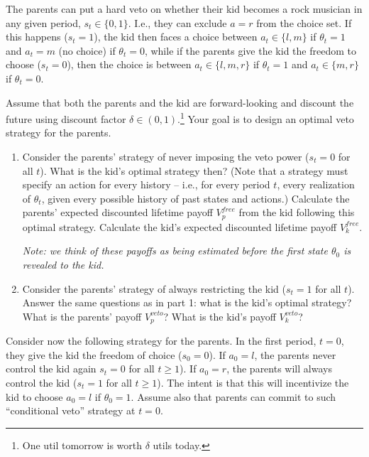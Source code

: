 \documentclass[a4paper]{article}
\begin{document}
	The parents can put a hard veto on whether their kid becomes a rock musician in any given period, $s_t \in \{0,1\}$. I.e., they can exclude $a=r$ from the choice set. If this happens ($s_t=1$), the kid then faces a choice between $a_t \in \{l,m\}$ if $\theta_t=1$ and $a_t = m$ (no choice) if $\theta_t=0$, while if the parents give the kid the freedom to choose ($s_t=0$), then the choice is between $a_t \in \{l,m,r\}$ if $\theta_t=1$ and $a_t \in \{m,r\}$ if $\theta_t=0$.
	
	Assume that both the parents and the kid are forward-looking and discount the future using discount factor $\delta \in (0,1)$.\footnote{One util tomorrow is worth $\delta$ utils today.} Your goal is to design an optimal veto strategy for the parents. 
	
	\begin{enumerate}
		\item Consider the parents' strategy of never imposing the veto power ($s_t=0$ for all $t$). What is the kid's optimal strategy then? (Note that a strategy must specify an action for every history -- i.e., for every period $t$, every realization of $\theta_t$, given every possible history of past states and actions.) Calculate the parents' expected discounted lifetime payoff $V_p^{free}$ from the kid following this optimal strategy. Calculate the kid's expected discounted lifetime payoff $V_k^{free}$.
		
		\emph{Note: we think of these payoffs as being estimated before the first state $\theta_0$ is revealed to the kid.}
		
		\item Consider the parents' strategy of always restricting the kid ($s_t=1$ for all $t$). Answer the same questions as in part 1: what is the kid's optimal strategy? What is the parents' payoff $V_p^{veto}$? What is the kid's payoff $V_k^{veto}$?
	\end{enumerate}
	
	Consider now the following strategy for the parents. In the first period, $t=0$, they give the kid the freedom of choice ($s_0=0$). If $a_0=l$, the parents never control the kid again $s_t=0$ for all $t \geq 1$). If $a_0=r$, the parents will always control the kid ($s_t=1$ for all $t \geq 1$). The intent is that this will incentivize the kid to choose $a_0=l$ if $\theta_0=1$. Assume also that parents can commit to such ``conditional veto'' strategy at $t=0$.
	
\end{document}
